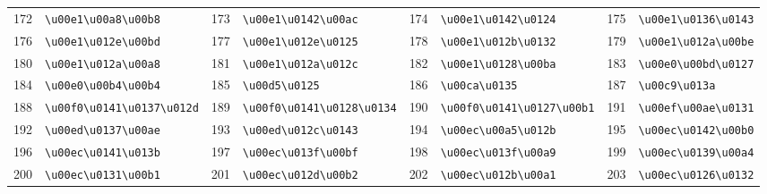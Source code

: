 \begin{table}[!htbp]
\begin{tabular}{r l r l r l r l}
172 & \texttt{\textbackslash{}u00e1\textbackslash{}u00a8\textbackslash{}u00b8} & 173 & \texttt{\textbackslash{}u00e1\textbackslash{}u0142\textbackslash{}u00ac} & 174 & \texttt{\textbackslash{}u00e1\textbackslash{}u0142\textbackslash{}u0124} & 175 & \texttt{\textbackslash{}u00e1\textbackslash{}u0136\textbackslash{}u0143} \\
176 & \texttt{\textbackslash{}u00e1\textbackslash{}u012e\textbackslash{}u00bd} & 177 & \texttt{\textbackslash{}u00e1\textbackslash{}u012e\textbackslash{}u0125} & 178 & \texttt{\textbackslash{}u00e1\textbackslash{}u012b\textbackslash{}u0132} & 179 & \texttt{\textbackslash{}u00e1\textbackslash{}u012a\textbackslash{}u00be} \\
180 & \texttt{\textbackslash{}u00e1\textbackslash{}u012a\textbackslash{}u00a8} & 181 & \texttt{\textbackslash{}u00e1\textbackslash{}u012a\textbackslash{}u012c} & 182 & \texttt{\textbackslash{}u00e1\textbackslash{}u0128\textbackslash{}u00ba} & 183 & \texttt{\textbackslash{}u00e0\textbackslash{}u00bd\textbackslash{}u0127} \\
184 & \texttt{\textbackslash{}u00e0\textbackslash{}u00b4\textbackslash{}u00b4} & 185 & \texttt{\textbackslash{}u00d5\textbackslash{}u0125} & 186 & \texttt{\textbackslash{}u00ca\textbackslash{}u0135} & 187 & \texttt{\textbackslash{}u00c9\textbackslash{}u013a} \\
188 & \texttt{\textbackslash{}u00f0\textbackslash{}u0141\textbackslash{}u0137\textbackslash{}u012d} & 189 & \texttt{\textbackslash{}u00f0\textbackslash{}u0141\textbackslash{}u0128\textbackslash{}u0134} & 190 & \texttt{\textbackslash{}u00f0\textbackslash{}u0141\textbackslash{}u0127\textbackslash{}u00b1} & 191 & \texttt{\textbackslash{}u00ef\textbackslash{}u00ae\textbackslash{}u0131} \\
192 & \texttt{\textbackslash{}u00ed\textbackslash{}u0137\textbackslash{}u00ae} & 193 & \texttt{\textbackslash{}u00ed\textbackslash{}u012c\textbackslash{}u0143} & 194 & \texttt{\textbackslash{}u00ec\textbackslash{}u00a5\textbackslash{}u012b} & 195 & \texttt{\textbackslash{}u00ec\textbackslash{}u0142\textbackslash{}u00b0} \\
196 & \texttt{\textbackslash{}u00ec\textbackslash{}u0141\textbackslash{}u013b} & 197 & \texttt{\textbackslash{}u00ec\textbackslash{}u013f\textbackslash{}u00bf} & 198 & \texttt{\textbackslash{}u00ec\textbackslash{}u013f\textbackslash{}u00a9} & 199 & \texttt{\textbackslash{}u00ec\textbackslash{}u0139\textbackslash{}u00a4} \\
200 & \texttt{\textbackslash{}u00ec\textbackslash{}u0131\textbackslash{}u00b1} & 201 & \texttt{\textbackslash{}u00ec\textbackslash{}u012d\textbackslash{}u00b2} & 202 & \texttt{\textbackslash{}u00ec\textbackslash{}u012b\textbackslash{}u00a1} & 203 & \texttt{\textbackslash{}u00ec\textbackslash{}u0126\textbackslash{}u0132} \\

\end{tabular}
\end{table}
